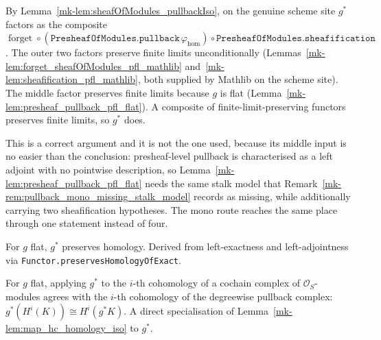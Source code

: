\begin{remark}
  \label{mk-rem:pullback_pfl_three_factor_route}
  By Lemma~\ref{mk-lem:sheafOfModules_pullbackIso}, on the genuine scheme site \(g^*\)
  factors as the composite
  \(\operatorname{forget} \circ
  (\texttt{PresheafOfModules.pullback}\,\varphi_{\mathrm{hom}}) \circ
  \texttt{PresheafOfModules.sheafification}\). The outer two factors preserve finite
  limits unconditionally (Lemmas~\ref{mk-lem:forget_sheafOfModules_pfl_mathlib}
  and~\ref{mk-lem:sheafification_pfl_mathlib}, both supplied by Mathlib on the scheme
  site). The middle factor preserves finite limits because \(g\) is flat
  (Lemma~\ref{mk-lem:presheaf_pullback_pfl_flat}). A composite of
  finite-limit-preserving functors preserves finite limits, so \(g^*\) does.

  This is a correct argument and it is not the one used, because its middle input is no easier
  than the conclusion: presheaf-level pullback is characterised as a left adjoint with no
  pointwise description, so Lemma~\ref{mk-lem:presheaf_pullback_pfl_flat} needs the same stalk
  model that Remark~\ref{mk-rem:pullback_mono_missing_stalk_model} records as missing, while
  additionally carrying two sheafification hypotheses. The mono route reaches the same place
  through one statement instead of four.
\end{remark}

\begin{lemma}
  \label{mk-lem:pullback_preserves_homology}

  For \(g\) flat, \(g^*\) preserves homology. Derived from left-exactness and
  left-adjointness via \texttt{Functor.preservesHomologyOfExact}.
\end{lemma}

\begin{lemma}\label{mk-lem:pullback_mapHC_homologyIso}
  \leanok

  For \(g\) flat, applying \(g^*\) to the \(i\)-th cohomology of a cochain complex of
  \(\mathcal{O}_S\)-modules agrees with the \(i\)-th cohomology of the degreewise
  pullback complex: \(g^*(H^i(K)) \cong H^i(g^* K)\). A direct specialisation of
  Lemma~\ref{mk-lem:map_hc_homology_iso} to \(g^*\).
\end{lemma}

